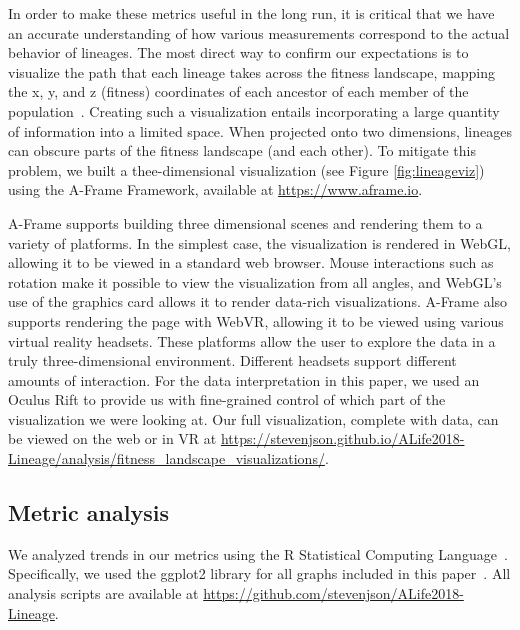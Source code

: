 \documentclass[letterpaper]{article}
\begin{document}
In order to make these metrics useful in the long run, it is critical that we have an accurate understanding of how various measurements correspond to the actual behavior of lineages. The most direct way to confirm our expectations is to visualize the path that each lineage takes across the fitness landscape, mapping the x, y, and z (fitness) coordinates of each ancestor of each member of the population~\citep{virgo_lineage_2017}. Creating such a visualization entails incorporating a large quantity of information into a limited space. When projected onto two dimensions, lineages can obscure parts of the fitness landscape (and each other). To mitigate this problem, we built a thee-dimensional visualization (see Figure \ref{fig:lineageviz}) using the A-Frame Framework, available at \url{https://www.aframe.io}.

A-Frame supports building three dimensional scenes and rendering them to a variety of platforms. In the simplest case, the visualization is rendered in WebGL, allowing it to be viewed in a standard web browser. Mouse interactions such as rotation make it possible to view the visualization from all angles, and WebGL's use of the graphics card allows it to render data-rich visualizations. A-Frame also supports rendering the page with WebVR, allowing it to be viewed using various virtual reality headsets. These platforms allow the user to explore the data in a truly three-dimensional environment. Different headsets support different amounts of interaction. For the data interpretation in this paper, we used an Oculus Rift to provide us with fine-grained control of which part of the visualization we were looking at. Our full visualization, complete with data, can be viewed on the web or in VR at \url{https://stevenjson.github.io/ALife2018-Lineage/analysis/fitness_landscape_visualizations/}.

\subsection{Metric analysis}

We analyzed trends in our metrics using the R Statistical Computing Language~\citep{r_core_team_r:_2017}. Specifically, we used the ggplot2 library for all graphs included in this paper~\citep{wickham_ggplot2:_2009}. All analysis scripts are available at \url{https://github.com/stevenjson/ALife2018-Lineage}.
\end{document}
